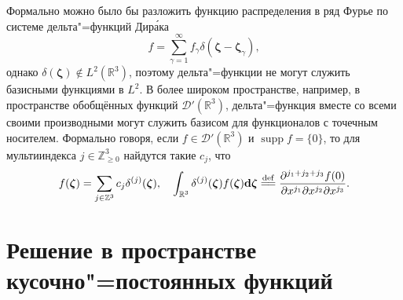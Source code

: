 \documentclass{article}
\DeclareMathOperator{\supp}{supp}
\newcommand{\dd}{\mathrm{d}}
\newcommand{\dzeta}{\boldsymbol{\dd\zeta}}
\newcommand{\bzeta}{\boldsymbol{\zeta}}
\newcommand{\eqdef}{\overset{\mathrm{def}}{=\joinrel=}}
\begin{document}
Формально можно было бы разложить функцию распределения в ряд Фурье по системе дельта"=функций Дир\'{а}ка
\begin{equation}\label{eq:Dirac_basis_L2}
    f = \sum_{\gamma=1}^\infty f_\gamma\delta(\bzeta - \bzeta_\gamma),
\end{equation}
однако \(\delta(\bzeta)\notin L^2(\mathbb{R}^3)\), поэтому дельта"=функции не могут служить базисными функциями в \(L^2\).
В более широком пространстве, например, в пространстве обобщённых функций \(\mathcal{D}'(\mathbb{R}^3)\),
дельта"=функция вместе со всеми своими производными могут служить базисом для функционалов с точечным носителем.
Формально говоря, если \(f\in\mathcal{D}'(\mathbb{R}^3)\) и \(\supp{f}=\{0\}\),
то для мультииндекса \(j\in\mathbb{Z}_{\geqslant0}^3\) найдутся такие \({c_j}\), что
\begin{equation}\label{eq:Dirac_basis_D'}
    f(\bzeta) = \sum_{j\in\mathbb{Z}^3} c_j \delta^{(j)}(\bzeta), \quad
    \int_{\mathbb{R}^3} \delta^{(j)}(\bzeta) f(\bzeta) \dzeta \eqdef
        \frac{\partial^{j_1+j_2+j_3}f(0)}{\partial x^{j_1}\partial x^{j_2}\partial x^{j_3}}.
\end{equation}

\section{Решение в пространстве кусочно"=постоянных функций}
\end{document}
